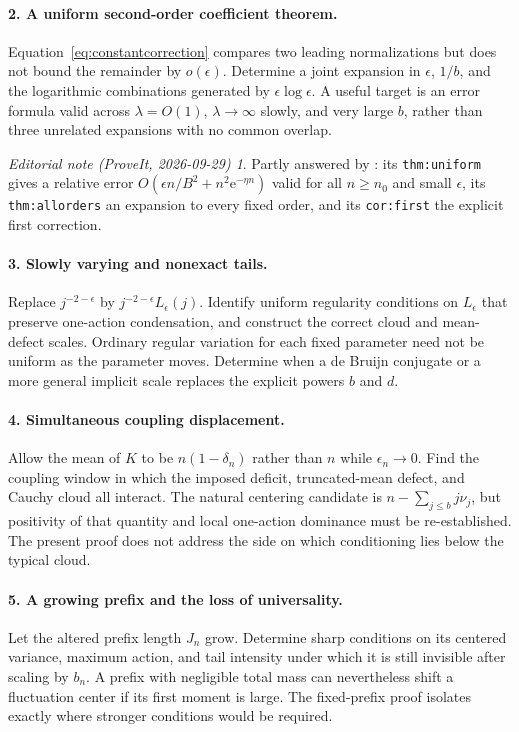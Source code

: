 \documentclass[11pt,a4paper]{article}
\numberwithin{equation}{section}
\theoremstyle{definition}
\theoremstyle{remark}
\newtheorem*{ednote}{Editorial note (ProveIt, 2026-09-29)}
\newcommand{\ee}{\epsilon}
\begin{document}
\paragraph{2. A uniform second-order coefficient theorem.}
Equation~\eqref{eq:constantcorrection} compares two leading normalizations
but does not bound the remainder by $o(\ee)$. Determine a joint expansion
in $\ee$, $1/b$, and the logarithmic combinations generated by
$\ee\log\ee$. A useful target is an error formula valid across
$\lambda=O(1)$, $\lambda\to\infty$ slowly, and very large $b$, rather than
three unrelated expansions with no common overlap.
\begin{ednote}
Partly answered by
: its
\texttt{thm:uniform} gives a relative error $O(\ee n/B^2+n^2\mathrm e^{-\eta n})$
valid for all $n\ge n_0$ and small $\ee$, its \texttt{thm:allorders} an
expansion to every fixed order, and its \texttt{cor:first} the explicit
first correction.
\end{ednote}

\paragraph{3. Slowly varying and nonexact tails.}
Replace $j^{-2-\ee}$ by $j^{-2-\ee}L_\ee(j)$. Identify uniform regularity
conditions on $L_\ee$ that preserve one-action condensation, and construct
the correct cloud and mean-defect scales. Ordinary regular variation for
each fixed parameter need not be uniform as the parameter moves. Determine
when a de Bruijn conjugate or a more general implicit scale replaces the
explicit powers $b$ and $d$.

\paragraph{4. Simultaneous coupling displacement.}
Allow the mean of $K$ to be $n(1-\delta_n)$ rather than $n$ while
$\ee_n\to0$. Find the coupling window in which the imposed deficit,
truncated-mean defect, and Cauchy cloud all interact. The natural
centering candidate is $n-\sum_{j\le b}j\nu_j$, but positivity of that
quantity and local one-action dominance must be re-established. The
present proof does not address the side on which conditioning lies below
the typical cloud.

\paragraph{5. A growing prefix and the loss of universality.}
Let the altered prefix length $J_n$ grow. Determine sharp conditions on its
centered variance, maximum action, and tail intensity under which it is
still invisible after scaling by $b_n$. A prefix with negligible total
mass can nevertheless shift a fluctuation center if its first moment is
large. The fixed-prefix proof isolates exactly where stronger conditions
would be required.
\end{document}
